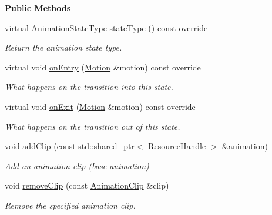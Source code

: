 \begin{Indent}\textbf{ Public Methods}\par
\begin{DoxyCompactItemize}
\item 
\mbox{\label{classrev_1_1_animation_state_afd8e70ee6e514f63e0e3a7feebaf3834}} 
virtual Animation\+State\+Type \mbox{\hyperlink{classrev_1_1_animation_state_afd8e70ee6e514f63e0e3a7feebaf3834}{state\+Type}} () const override
\begin{DoxyCompactList}\small\item\em Return the animation state type. \end{DoxyCompactList}\item 
\mbox{\label{classrev_1_1_animation_state_a73d7fcb803f0ee20da181246a1e62236}} 
virtual void \mbox{\hyperlink{classrev_1_1_animation_state_a73d7fcb803f0ee20da181246a1e62236}{on\+Entry}} (\mbox{\hyperlink{classrev_1_1_motion}{Motion}} \&motion) const override
\begin{DoxyCompactList}\small\item\em What happens on the transition into this state. \end{DoxyCompactList}\item 
\mbox{\label{classrev_1_1_animation_state_a142ff73005264f15fa3298d07eaad29c}} 
virtual void \mbox{\hyperlink{classrev_1_1_animation_state_a142ff73005264f15fa3298d07eaad29c}{on\+Exit}} (\mbox{\hyperlink{classrev_1_1_motion}{Motion}} \&motion) const override
\begin{DoxyCompactList}\small\item\em What happens on the transition out of this state. \end{DoxyCompactList}\item 
\mbox{\label{classrev_1_1_animation_state_a79d18b40a93030ecf121622d793ee907}} 
void \mbox{\hyperlink{classrev_1_1_animation_state_a79d18b40a93030ecf121622d793ee907}{add\+Clip}} (const std\+::shared\+\_\+ptr$<$ \mbox{\hyperlink{classrev_1_1_resource_handle}{Resource\+Handle}} $>$ \&animation)
\begin{DoxyCompactList}\small\item\em Add an animation clip (base animation) \end{DoxyCompactList}\item 
\mbox{\label{classrev_1_1_animation_state_af175847fa07fa394c5edf1d227b7648d}} 
void \mbox{\hyperlink{classrev_1_1_animation_state_af175847fa07fa394c5edf1d227b7648d}{remove\+Clip}} (const \mbox{\hyperlink{classrev_1_1_animation_clip}{Animation\+Clip}} \&clip)
\begin{DoxyCompactList}\small\item\em Remove the specified animation clip. \end{DoxyCompactList}\end{DoxyCompactItemize}
\end{Indent}
